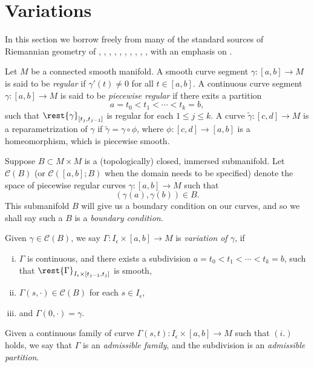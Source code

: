 


\section{Variations}

\begin{tcolorbox}
In this section we borrow freely from many of the standard sources of Riemannian geometry of \cite{ballmann2015critical}, \cite{carmo1992riemannian}, \cite{chavel2006riemannian}, \cite{gallot1990riemannian}, \cite{klingenberg1995riemannian}, \cite{lang1995differential} \cite{lee2006riemannian}, \cite{morse1928calculus}, \cite{nicolaescu2007lectures}, \cite{o1983semi}, \cite{petersen2006riemannian}, with an emphasis on \cite{sakai1996riemannian}.
\end{tcolorbox}


Let $M$ be a connected smooth manifold.  A smooth curve segment $\gamma:[a,b]\to M$ is said to be \textit{regular} if $\gamma'(t)\neq0$ for all $t\in[a,b]$.  A continuous curve segment $\gamma:[a,b]\to M$ is said to be \textit{piecewise regular} if there exits a partition
$$a=t_0<t_1<\cdots<t_k=b,$$
such that $\rest{\gamma}_{[t_j,t_{j-1}]}$ is regular for each $1\leq j\leq k$.  A curve $\tilde{\gamma}:[c,d]\to M$ is a reparametrization of $\gamma$ if $\tilde{\gamma}=\gamma\circ\phi$, where $\phi:[c,d]\to[a,b]$ is a homeomorphism, which is piecewise smooth.

Suppose $B\subset M\times M$ is a (topologically) closed, immersed submanifold.  Let $\mathcal{C}(B)$ (or $\mathcal{C}([a,b];B)$ when the domain needs to be specified) denote the space of piecewise regular curves $\gamma:[a,b]\to M$ such that
$$(\gamma(a),\gamma(b))\in B.$$
This submanifold $B$ will give us a boundary condition on our curves, and so we shall say such a $B$ is a \textit{boundary condition}.

Given $\gamma\in\mathcal{C}(B)$, we say $\Gamma:I_\epsilon\times[a,b]\to M$ is \textit{variation of $\gamma$}, if 
\begin{enumerate}[i.]
	\item $\Gamma$ is continuous, and there exists a subdivision $a=t_0<t_1<\cdots<t_k=b$, such that $\rest{\Gamma}_{I_\epsilon\times[t_{j-1},t_j]}$ is smooth,
	\item $\Gamma(s,\cdot)\in\mathcal{C}(B)$ for each $s\in I_\epsilon$, 
	\item and $\Gamma(0,\cdot)=\gamma$.
\end{enumerate}

Given a continuous family of curve $\Gamma(s,t):I_\epsilon\times[a,b]\to M$ such that $(i.)$ holds, we say that $\Gamma$ is an \textit{admissible family}, and the subdivision is an \textit{admissible partition}.  


